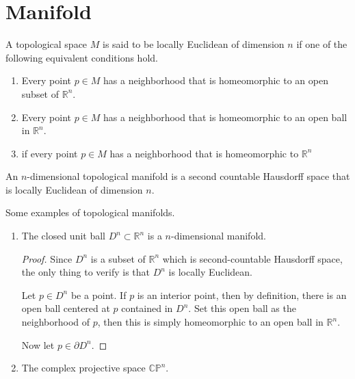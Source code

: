 \chapter{Manifold}

\begin{defbox}
    \begin{definition}
        A topological space \(M\) is said to be locally Euclidean of dimension \(n\) if one of the following equivalent conditions hold.
        \begin{enumerate}
            \item Every point \(p \in M\) has a neighborhood that is homeomorphic to an open subset of \(\mathbb{R}^n\).
            \item Every point \(p \in M\) has a neighborhood that is homeomorphic to an open ball in \(\mathbb{R}^n\).
            \item if every point \(p \in M\) has a neighborhood that is homeomorphic to \(\mathbb{R}^n\)
        \end{enumerate}
    \end{definition}
\end{defbox}

\begin{defbox}
    \begin{definition}
        An \(n\)-dimensional topological manifold is a second countable Hausdorff space that is locally Euclidean of dimension \(n\).
    \end{definition}
\end{defbox}

\begin{example}
    Some examples of topological manifolds.
    \begin{enumerate}
        \item The closed unit ball \(D^n \subset \mathbb{R}^n\) is a \(n\)-dimensional manifold.
        \begin{proof}
            Since \(D^n\) is a subset of \(\mathbb{R}^n\) which is second-countable Hausdorff space, the only thing to verify is that \(D^n\) is locally Euclidean.

            Let \(p \in D^n\) be a point. If \(p\) is an interior point, then by definition, there is an open ball centered at \(p\) contained in \(D^n\). Set this open ball as the neighborhood of \(p\), then this is simply homeomorphic to an open ball in \(\mathbb{R}^n\).

            Now let \(p \in \partial D^n\).
        \end{proof}
        \item The complex projective space \(\mathbb{C}\mathbb{P}^n\).
    \end{enumerate}
\end{example}